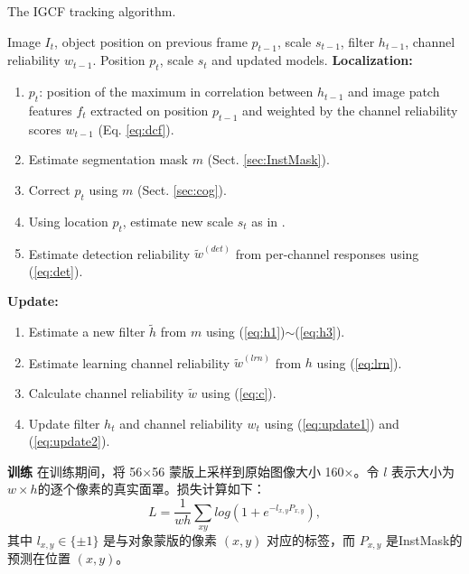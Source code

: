\begin{algorithm}
  \caption{The IGCF tracking algorithm.} 
  \begin{algorithmic}
    \Require Image $I_t$, object position on previous frame $p_{t-1}$, scale $s_{t-1}$, filter $h_{t-1}$, channel reliability $w_{t-1}$.
    \Ensure Position $p_t$, scale $s_t$ and updated models.
  \Statex
  \State \textbf{Localization:}
  \begin{enumerate}[leftmargin=0pt,itemindent=1.5em]
    \item $p_t$: position of the maximum in correlation between $h_{t-1}$ and image patch features $f_{t}$ extracted on position $p_{t-1}$ and weighted by the channel reliability scores $w_{t-1}$ (Eq. \ref{eq:dcf}).
    \item Estimate segmentation mask $m$ (Sect. \ref{sec:InstMask}).
    \item Correct $p_t$ using $m$ (Sect. \ref{sec:cog}).
    \item Using location $p_t$, estimate new scale $s_ t$ as in \cite{Danelljan2014AccurateSE}.
    \item Estimate detection reliability $\tilde{w}^{(det)}$  from per-channel responses using (\ref{eq:det}).
  \end{enumerate}
  \State \textbf{Update:}
  \begin{enumerate}[leftmargin=0pt,itemindent=1.5em]
    \item Estimate a new filter $\tilde{h}$ from $m$ using (\ref{eq:h1})$\sim$(\ref{eq:h3}).
    \item Estimate learning channel reliability $\tilde{w}^{(lrn)}$ from $h$ using (\ref{eq:lrn}).
    \item Calculate channel reliability $\tilde{w}$ using (\ref{eq:c}).
    \item Update filter $h_t$ and channel reliability $w_t$ using (\ref{eq:update1}) and (\ref{eq:update2}).
  \end{enumerate}
\end{algorithmic}
\end{algorithm}

\textbf{训练} 在训练期间，将 56$\times$56 蒙版上采样到原始图像大小 160$\times$。令 $l$ 表示大小为 $w \times h$的逐个像素的真实面罩。损失计算如下：
\begin{equation}
L = \frac{1}{wh} \sum_{xy}{log(1+e^{-l_{x,y}P_{x,y}})},
\end{equation}
其中 $l_{x,y} \in \{ \pm 1 \}$ 是与对象蒙版的像素 $(x,y)$ 对应的标签，而 $P_{x,y}$ 是InstMask的预测在位置 $(x,y)$。

